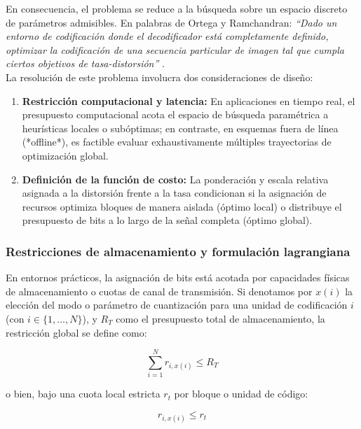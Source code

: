         En consecuencia, el problema se reduce a la búsqueda sobre un espacio discreto de parámetros admisibles. En palabras de Ortega y Ramchandran: \textit{``Dado un entorno de codificación donde el decodificador está completamente definido, optimizar la codificación de una secuencia particular de imagen tal que cumpla ciertos objetivos de tasa-distorsión''} \cite{ortega1998rate}.\\

        La resolución de este problema involucra dos consideraciones de diseño:
        \begin{enumerate}
            \item \textbf{Restricción computacional y latencia:} En aplicaciones en tiempo real, el presupuesto computacional acota el espacio de búsqueda paramétrica a heurísticas locales o subóptimas; en contraste, en esquemas fuera de línea (*offline*), es factible evaluar exhaustivamente múltiples trayectorias de optimización global.
            \item \textbf{Definición de la función de costo:} La ponderación y escala relativa asignada a la distorsión frente a la tasa condicionan si la asignación de recursos optimiza bloques de manera aislada (óptimo local) o distribuye el presupuesto de bits a lo largo de la señal completa (óptimo global).
        \end{enumerate}

        \subsubsection{Restricciones de almacenamiento y formulación lagrangiana}
            En entornos prácticos, la asignación de bits está acotada por capacidades físicas de almacenamiento o cuotas de canal de transmisión. Si denotamos por $x(i)$ la elección del modo o parámetro de cuantización para una unidad de codificación $i$ (con $i \in \{1, \dots, N\}$), y $R_T$ como el presupuesto total de almacenamiento, la restricción global se define como:

            \begin{equation}
                \sum_{i=1}^{N} r_{i, x(i)} \leq R_T
            \end{equation}

            o bien, bajo una cuota local estricta $r_t$ por bloque o unidad de código:

            \begin{equation}
                r_{i, x(i)} \leq r_t
            \end{equation}

